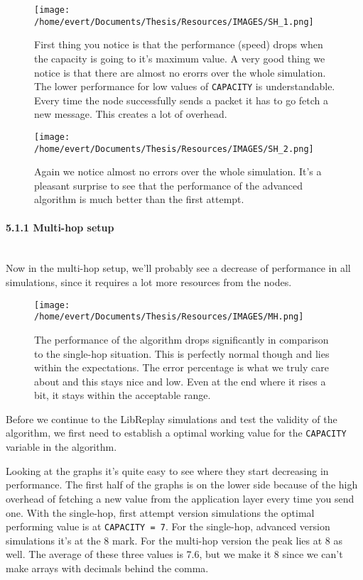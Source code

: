 \begin{figure}[htbp]
\centering
\texttt{[image: /home/evert/Documents/Thesis/Resources/IMAGES/SH\_1.png]}
\caption{First thing you notice is that the performance (speed) drops
when the capacity is going to it's maximum value. A very good thing we
notice is that there are almost no erorrs over the whole simulation. The
lower performance for low values of \texttt{CAPACITY} is understandable.
Every time the node successfully sends a packet it has to go fetch a new
message. This creates a lot of overhead.}
\end{figure}

\begin{figure}[htbp]
\centering
\texttt{[image: /home/evert/Documents/Thesis/Resources/IMAGES/SH\_2.png]}
\caption{Again we notice almost no errors over the whole simulation.
It's a pleasant surprise to see that the performance of the advanced
algorithm is much better than the first attempt.}
\end{figure}

\paragraph{5.1.1 Multi-hop setup\\\\}\label{multi-hop-setup}

Now in the multi-hop setup, we'll probably see a decrease of performance
in all simulations, since it requires a lot more resources from the
nodes.

\begin{figure}[htbp]
\centering
\texttt{[image: /home/evert/Documents/Thesis/Resources/IMAGES/MH.png]}
\caption{The performance of the algorithm drops significantly in
comparison to the single-hop situation. This is perfectly normal though
and lies within the expectations. The error percentage is what we truly
care about and this stays nice and low. Even at the end where it rises a
bit, it stays within the acceptable range.}
\end{figure}

Before we continue to the LibReplay simulations and test the validity of
the algorithm, we first need to establish a optimal working value for
the \texttt{CAPACITY} variable in the algorithm.

Looking at the graphs it's quite easy to see where they start decreasing
in performance. The first half of the graphs is on the lower side
because of the high overhead of fetching a new value from the
application layer every time you send one. With the single-hop, first
attempt version simulations the optimal performing value is at
\texttt{CAPACITY = 7}. For the single-hop, advanced version simulations
it's at the 8 mark. For the multi-hop version the peak lies at 8 as
well. The average of these three values is 7.6, but we make it 8 since
we can't make arrays with decimals behind the comma.

